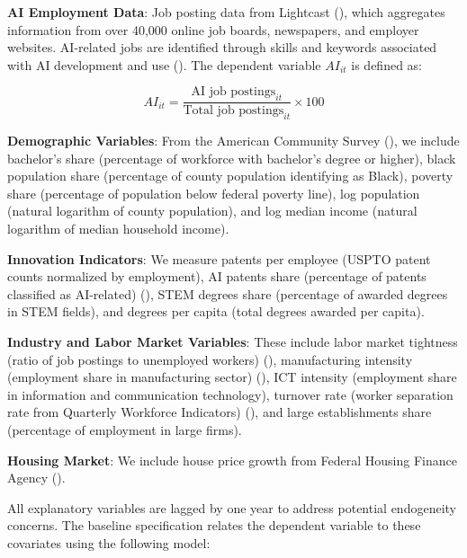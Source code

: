 \documentclass[
]{article}
\begin{document}
\textbf{AI Employment Data}: Job posting data from Lightcast
(), which aggregates
information from over 40,000 online job boards, newspapers, and employer
websites. AI-related jobs are identified through skills and keywords
associated with AI development and use
(). The dependent
variable \(AI_{it}\) is defined as:

\[
AI_{it} = \frac{\text{AI job postings}_{it}}{\text{Total job postings}_{it}} \times 100 \tag{1}
\]

\textbf{Demographic Variables}: From the American Community Survey
(), we include
bachelor's share (percentage of workforce with bachelor's degree or
higher), black population share (percentage of county population
identifying as Black), poverty share (percentage of population below
federal poverty line), log population (natural logarithm of county
population), and log median income (natural logarithm of median
household income).

\textbf{Innovation Indicators}: We measure patents per employee (USPTO
patent counts normalized by employment), AI patents share (percentage of
patents classified as AI-related) (), STEM degrees share (percentage of awarded
degrees in STEM fields), and degrees per capita (total degrees awarded
per capita).

\textbf{Industry and Labor Market Variables}: These include labor market
tightness (ratio of job postings to unemployed workers)
(),
manufacturing intensity (employment share in manufacturing sector)
(), ICT intensity
(employment share in information and communication technology), turnover
rate (worker separation rate from Quarterly Workforce Indicators)
(), and large
establishments share (percentage of employment in large firms).

\textbf{Housing Market}: We include house price growth from Federal
Housing Finance Agency ().

All explanatory variables are lagged by one year to address potential
endogeneity concerns. The baseline specification relates the dependent
variable to these covariates using the following model:
\end{document}
